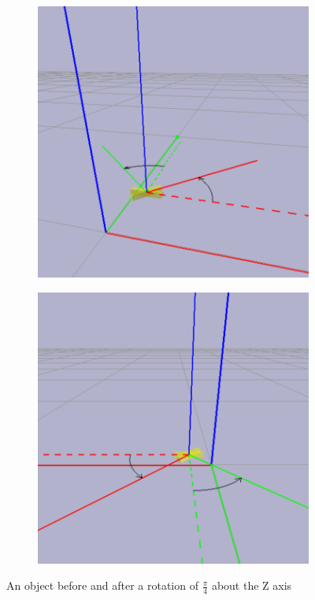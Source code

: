 \begin{figure}[h]
    \centering
    \begin{subfigure}[b]{0.45\textwidth}
        \includegraphics[width=\textwidth]{figures/coordinate_figure1.png}
    \end{subfigure}
    \hfill
    \begin{subfigure}[b]{0.45\textwidth}
        \includegraphics[width=\textwidth]{figures/coordinate_figure2.png}
    \end{subfigure}
    \caption[An object before and after a rotation of $\frac{\pi}{4}$ about the Z axis]{An object before and after a rotation of $\frac{\pi}{4}$ about the Z axis \footnotemark}
    \label{fig:orientations}
\end{figure}

